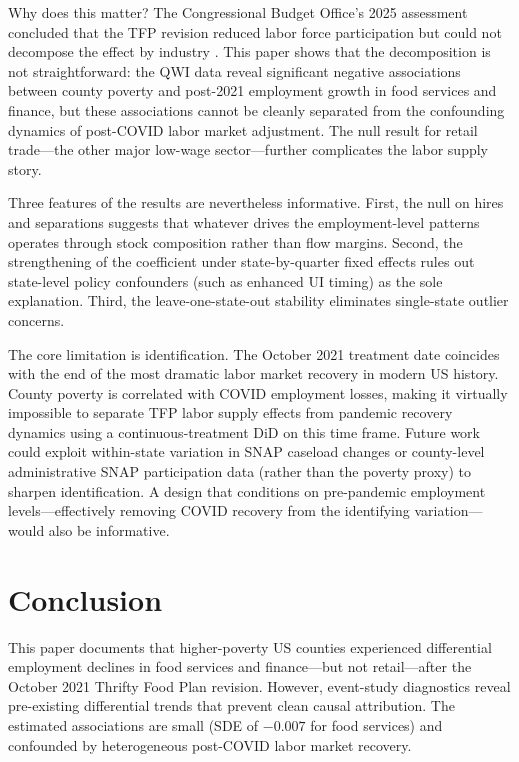\documentclass[12pt]{article}
\begin{document}
Why does this matter? The Congressional Budget Office's 2025 assessment concluded that the TFP revision reduced labor force participation but could not decompose the effect by industry \citep{cbo2025}. This paper shows that the decomposition is not straightforward: the QWI data reveal significant negative associations between county poverty and post-2021 employment growth in food services and finance, but these associations cannot be cleanly separated from the confounding dynamics of post-COVID labor market adjustment. The null result for retail trade---the other major low-wage sector---further complicates the labor supply story.

Three features of the results are nevertheless informative. First, the null on hires and separations suggests that whatever drives the employment-level patterns operates through stock composition rather than flow margins. Second, the strengthening of the coefficient under state-by-quarter fixed effects rules out state-level policy confounders (such as enhanced UI timing) as the sole explanation. Third, the leave-one-state-out stability eliminates single-state outlier concerns.

The core limitation is identification. The October 2021 treatment date coincides with the end of the most dramatic labor market recovery in modern US history. County poverty is correlated with COVID employment losses, making it virtually impossible to separate TFP labor supply effects from pandemic recovery dynamics using a continuous-treatment DiD on this time frame. Future work could exploit within-state variation in SNAP caseload changes or county-level administrative SNAP participation data (rather than the poverty proxy) to sharpen identification. A design that conditions on pre-pandemic employment levels---effectively removing COVID recovery from the identifying variation---would also be informative.


\section{Conclusion}

This paper documents that higher-poverty US counties experienced differential employment declines in food services and finance---but not retail---after the October 2021 Thrifty Food Plan revision. However, event-study diagnostics reveal pre-existing differential trends that prevent clean causal attribution. The estimated associations are small (SDE of $-0.007$ for food services) and confounded by heterogeneous post-COVID labor market recovery.
\end{document}
